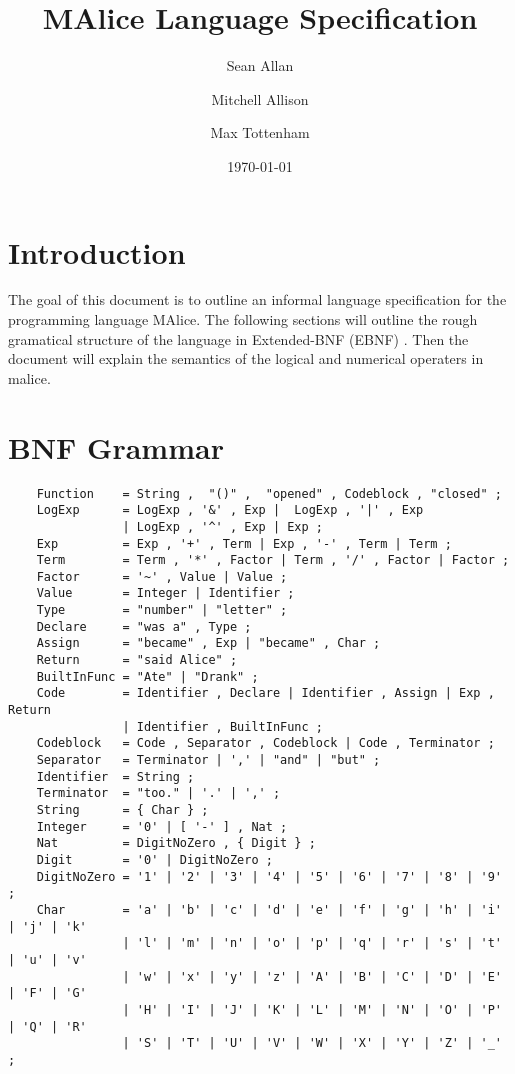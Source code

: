 \documentclass[a4wide, 10pt]{article}
\begin{document}
\title{MAlice Language Specification}

\author{Sean Allan \and Mitchell Allison \and Max Tottenham}

\date{\today}         %

\maketitle            %

\section{Introduction}
The goal of this document is to outline an informal language specification for 
the programming language MAlice. The following sections will outline the rough
gramatical structure of the language in Extended-BNF (EBNF) \cite{Wikipedia}. 
Then the document will explain the semantics of the logical and numerical operaters in malice.
\section{BNF Grammar} 
\begin{verbatim}
    Function    = String ,  "()" ,  "opened" , Codeblock , "closed" ;
    LogExp      = LogExp , '&' , Exp |  LogExp , '|' , Exp 
                | LogExp , '^' , Exp | Exp ;
    Exp         = Exp , '+' , Term | Exp , '-' , Term | Term ;
    Term        = Term , '*' , Factor | Term , '/' , Factor | Factor ;
    Factor      = '~' , Value | Value ;
    Value       = Integer | Identifier ;
    Type        = "number" | "letter" ;
    Declare     = "was a" , Type ;
    Assign      = "became" , Exp | "became" , Char ;
    Return      = "said Alice" ;
    BuiltInFunc = "Ate" | "Drank" ;
    Code        = Identifier , Declare | Identifier , Assign | Exp , Return  
                | Identifier , BuiltInFunc ;
    Codeblock   = Code , Separator , Codeblock | Code , Terminator ; 
    Separator   = Terminator | ',' | "and" | "but" ; 
    Identifier  = String ;
    Terminator  = "too." | '.' | ',' ;
    String      = { Char } ;
    Integer     = '0' | [ '-' ] , Nat ;
    Nat         = DigitNoZero , { Digit } ;
    Digit       = '0' | DigitNoZero ; 
    DigitNoZero = '1' | '2' | '3' | '4' | '5' | '6' | '7' | '8' | '9' ;
    Char        = 'a' | 'b' | 'c' | 'd' | 'e' | 'f' | 'g' | 'h' | 'i' | 'j' | 'k' 
                | 'l' | 'm' | 'n' | 'o' | 'p' | 'q' | 'r' | 's' | 't' | 'u' | 'v'
                | 'w' | 'x' | 'y' | 'z' | 'A' | 'B' | 'C' | 'D' | 'E' | 'F' | 'G'
                | 'H' | 'I' | 'J' | 'K' | 'L' | 'M' | 'N' | 'O' | 'P' | 'Q' | 'R'
                | 'S' | 'T' | 'U' | 'V' | 'W' | 'X' | 'Y' | 'Z' | '_' ;
\end{verbatim}
\end{document}
